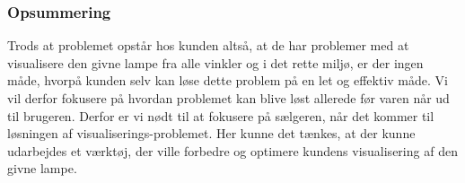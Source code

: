 \subsubsection*{Opsummering}
Trods at problemet opstår hos kunden altså, at de har problemer med at visualisere den givne lampe fra alle vinkler og i det rette miljø, er der ingen måde, hvorpå kunden selv kan løse dette problem på en let og effektiv måde. Vi vil derfor fokusere på hvordan problemet kan blive løst allerede før varen når ud til brugeren. Derfor er vi nødt til at fokusere på sælgeren, når det kommer til løsningen af visualiserings-problemet. Her kunne det tænkes, at der kunne udarbejdes et værktøj, der ville forbedre og optimere kundens visualisering af den givne lampe.

